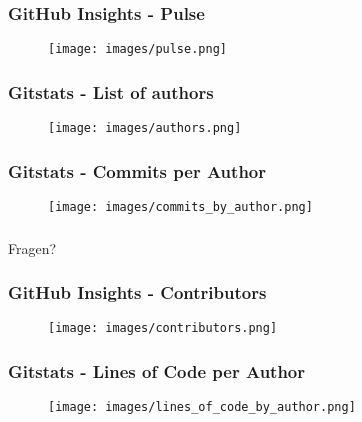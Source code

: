 \documentclass[11pt, usepdftitle=false,...]{beamer}
\begin{document}
		
			\begin{frame}
				\frametitle{GitHub Insights - Pulse}
				\begin{figure}[ht] 
					\centering
					\texttt{[image: images/pulse.png]}
					\label{fig1}
				\end{figure}
			\end{frame}	
		
				
	
			\begin{frame}
				\frametitle{Gitstats - List of authors}
				\begin{figure}[ht] 
					\centering
					\texttt{[image: images/authors.png]}
					\label{fig3}
				\end{figure}
			\end{frame}
			
			
			
			\begin{frame}
				\frametitle{Gitstats - Commits per Author}
				\begin{figure}[ht] 
					\centering
					\texttt{[image: images/commits\_by\_author.png]}
					\label{fig5}
				\end{figure}
			\end{frame}
			
			\begin{frame}
				\frametitle{}
				\centering
				\Huge Fragen?
			\end{frame}
			
            \begin{frame}
                \frametitle{GitHub Insights - Contributors}
        		\begin{figure}[ht] 
        			\centering
        			\texttt{[image: images/contributors.png]}
        			\label{fig2}
        		\end{figure}
        	\end{frame}
        			
        	\begin{frame}
				\frametitle{Gitstats - Lines of Code per Author}
				\begin{figure}[ht] 
					\centering
					\texttt{[image: images/lines\_of\_code\_by\_author.png]}
					\label{fig4}
				\end{figure}
			\end{frame}		
        			
\end{document}
